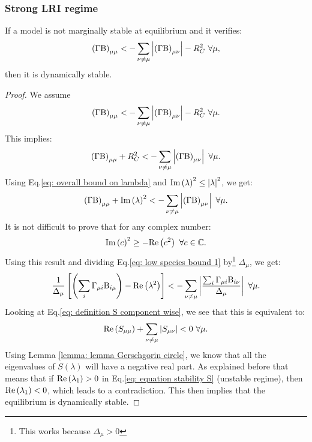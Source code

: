 \documentclass[12pt, titlepage]{report}
\begin{document}
\subsubsection{Strong LRI regime}
\begin{theorem}\label{theorem: strong LRI regime}
If a model is not marginally stable at equilibrium and it verifies:
\begin{equation}
\left(\Gamma \Beta\right)_{\mu\mu} < - \sum_{\nu \neq \mu } \abs{\left(\Gamma \Beta\right)_{\mu \nu}} - R_C^2 \ \forall \mu,
\end{equation}
then it is dynamically stable.
\end{theorem}
\begin{proof}
We assume
\begin{equation}
\left(\Gamma \text{B}\right)_{\mu\mu} < - \sum_{\nu \neq \mu } \left|{\left(\Gamma \text{B}\right)_{\mu \nu}}\right| -R_C^2 \ \forall \mu.
\end{equation}
This implies:
\begin{equation}
\left(\Gamma \text{B}\right)_{\mu\mu} + R_C^2< - \sum_{\nu \neq \mu } \left|{\left(\Gamma \text{B}\right)_{\mu \nu}}\right| \ \forall \mu.
\end{equation}
Using Eq.\eqref{eq: overall bound on lambda} and $\text{Im}\left(\lambda\right)^2 \leq \left|{\lambda}\right|^2$, we get:
\begin{equation}
  \left(\Gamma\text{B} \right)_{\mu\mu} + \text{Im}\left(\lambda\right)^2 < - \sum_{\nu \neq \mu } \left|{\left(\Gamma \text{B}\right)_{\mu \nu}}\right| \ \forall \mu. \label{eq: low species bound 1}
\end{equation}
It is not difficult to prove that for any complex number:
\begin{equation}
\text{Im}\left(c\right)^2 \geq - \text{Re}\left(c^2\right) \ \forall c \in \mathbb{C}.
\end{equation}
Using this result and dividing Eq.\eqref{eq: low species bound 1} by\footnote{This works because $\Delta_\mu > 0$} $\Delta_\mu$, we get:
\begin{equation}
\frac{1}{\Delta_\mu}\left[\left(\sum_i \Gamma_{\mu i} \text{B}_{i \mu} \right)-\text{Re}\left(\lambda^2\right)\right] < - \sum_{\nu \neq \mu } \left|{\frac{\sum_i \Gamma_{\mu i}\text{B}_{i\nu}}{\Delta_\mu}}\right| \ \forall \mu.
\end{equation}
Looking at Eq.\eqref{eq: definition S component wise}, we see that this is equivalent to:
\begin{equation}
\text{Re}\left(S_{\mu \mu}\right) + \sum_{\nu \neq \mu} \left|{S_{\mu \nu}}\right| < 0\ \forall \mu.
\end{equation}
Using Lemma \ref{lemma: lemma Gerschgorin circle}, we know that all the eigenvalues of $S(\lambda)$ will have a negative real part.
As explained before that means that if $\text{Re}\left(\lambda_1\right) > 0 $ in Eq.\eqref{eq: equation stability S} (unstable regime), then $\text{Re}\left(\lambda_1\right) < 0$, which leads to a contradiction. This then implies that the equilibrium is dynamically stable.
\end{proof}
\end{document}
